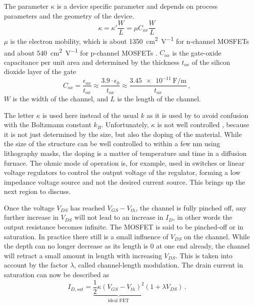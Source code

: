 The parameter $\kappa$ is a device specific parameter and depends on process parameters and the geometry of the device.
\begin{equation}
    \kappa = \kappa' \frac W L = \mu C_{ox} \frac W L
\end{equation}
$\mu$ is the electron mobility, which is about \qty{1350}{\square \cm \per \V} for n-channel MOSFETs and about \qty{540}{\square \cm \per \V} for p-channel MOSFETs \cite{fet_equations}. $C_{ox}$ is the gate-oxide capacitance per unit area and determined by the thickness $t_{ox}$ of the silicon dioxide layer of the gate
\begin{equation}
    C_{ox} = \frac{\epsilon_{ox}}{t_{ox}} \approx \frac{3.9 \cdot \epsilon_{0}}{t_{ox}} \approx \frac{\qty{3.45e-11}{\F \per \m}}{t_{ox}}\,,
\end{equation}
$W$ is the width of the channel, and $L$ is the length of the channel.

The letter $\kappa$ is used here instead of the usual $k$ as it is used by \citeauthor{fet_equations} \cite{fet_equations} to avoid confusion with the Boltzmann constant $k_B$. Unfortunately, $\kappa$ is not well controlled \cite{horowitz1989}, because it is not just determined by the size, but also the doping of the material. While the size of the structure can be well controlled to within a few \unit{\nm} using lithography masks, the doping is a matter of temperature and time in a diffusion furnace. The ohmic mode of operation is, for example, used in switches or linear voltage regulators to control the output voltage of the regulator, forming a low impedance voltage source and not the desired current source. This brings up the next region to discuss.

Once the voltage $V_{DS}$ has reached $V_{GS} - V_{th}$, the channel is fully pinched off, any further increase in $V_{DS}$ will not lead to an increase in $I_D$, in other words the output resistance becomes infinite. The MOSFET is said to be pinched-off or in saturation. In practice there still is a small influence of $V_{DS}$ on the channel. While the depth can no longer decrease as its length is \num{0} at one end already, the channel will retract a small amount in length with increasing $V_{DS}$. This is taken into account by the factor $\lambda$, called channel-length modulation. The drain current in saturation can now be described \cite{shockley_fet_equations} as
\begin{equation}
    I_{D,sat} = \underbrace{\frac 1 2 \kappa \left(V_{GS} - V_{th} \right)^2}_{\text{ideal FET}} (1 + \lambda V_{DS}) \, . \label{eqn:mosfet_saturation}
\end{equation}

